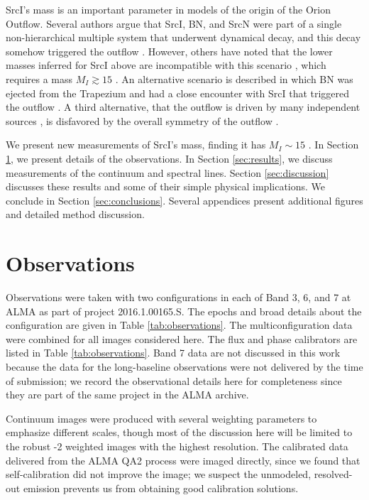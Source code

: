 \documentclass[twocolumn]{aastex61}
\newcommand{\sourcei}{SrcI\xspace}
\newcommand{\sourcen}{SrcN\xspace}
\newcommand{\sourcex}{SrcX\xspace}
\begin{document}
\sourcei's mass is an important parameter in models of the origin of the Orion
Outflow.  Several authors argue that \sourcei, BN, and \sourcen \citep[or,
alternatively, \sourcex;][]{Luhman2017a} were part of a single non-hierarchical
multiple system that underwent dynamical decay, and this decay somehow
triggered the outflow
\citep{Bally2005a,Rodriguez2005a,Goddi2011b,Moeckel2012b,Bally2011a,Bally2015a,Bally2017a,Rodriguez2017a}.
However, others have noted that the lower masses inferred for \sourcei above
are incompatible with this scenario
\citep{Chatterjee2012a,Plambeck2016a,Farias2017b}, which requires a mass $M_{I}
\gtrsim 15$ \msun.  An alternative scenario is described in which BN was
ejected from the Trapezium and had a close encounter with \sourcei that
triggered the outflow \citep{Tan2008a,Tan2008b,Chatterjee2012a}.  A third
alternative, that the outflow is driven by many independent sources
\citep{Beuther2008a}, is disfavored by the overall symmetry of the outflow
\citep{Bally2017a}.

We present new measurements of \sourcei's mass, finding it has $M_I \sim 15$ \msun.
In Section \ref{sec:observations}, we present details of the observations.
In Section \ref{sec:results}, we discuss measurements of the continuum
and spectral lines.  Section \ref{sec:discussion} discusses these results and
some of their simple physical implications.
We conclude in Section \ref{sec:conclusions}.
Several appendices present additional figures and detailed method discussion.


\section{Observations}
\label{sec:observations}

Observations were taken with two configurations in each of Band 3, 6, and 7 at
ALMA as part of project 2016.1.00165.S.  The epochs and broad details about the
configuration are given in Table \ref{tab:observations}.  The
multiconfiguration data were combined for all
images considered here.
The flux and phase calibrators are listed in Table \ref{tab:observations}.
Band 7 data are not discussed in this work because the data for
the long-baseline observations were not delivered by the time of submission; we
record the observational details here for completeness since they are part of
the same project in the ALMA archive.

Continuum images were produced with several weighting parameters to emphasize
different scales, though most of the discussion here will be limited to the
robust -2 weighted images with the highest resolution.  The calibrated data
delivered from the ALMA QA2 process were imaged directly, since we found
that self-calibration did not improve the image; we suspect the unmodeled, resolved-out
emission prevents us from obtaining good calibration solutions.
\end{document}
